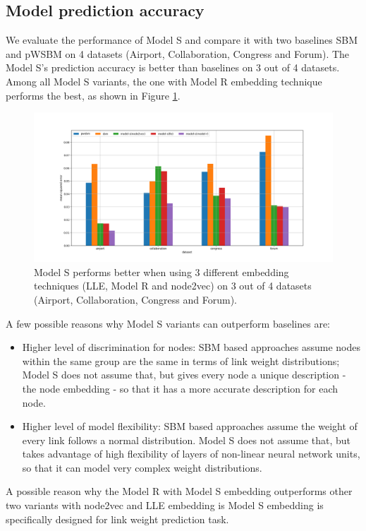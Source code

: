 \documentclass{article} %
\begin{document}
\subsection{Model prediction accuracy}
We evaluate the performance of Model S and compare it with two baselines SBM and pWSBM on 4 datasets (Airport, Collaboration, Congress and Forum).
The Model S's prediction accuracy is better than baselines on 3 out of 4 datasets.
Among all Model S variants,
the one with Model R embedding technique performs the best,
as shown in Figure \ref{fig:errors}.
\begin{figure}[h] \centering
	\includegraphics[width=1\linewidth]{weight-errors}
	\caption{
		Model S performs better when using 3 different embedding techniques (LLE, Model R and node2vec) on 3 out of 4 datasets (Airport, Collaboration, Congress and Forum).
	}
	\label{fig:errors}
\end{figure}
A few possible reasons why Model S variants can outperform baselines are:
\begin{itemize}
	\item Higher level of discrimination for nodes:
	SBM based approaches assume nodes within the same group are the same in terms of link weight distributions;
	Model S does not assume that,
	but gives every node a unique description - the node embedding - so that
	it has a more accurate description for each node.
	\item Higher level of model flexibility:
	SBM based approaches assume the weight of every link follows
	a normal distribution.
	Model S does not assume that, but takes advantage of high flexibility of
	layers of non-linear neural network units,
	so that it can model very complex weight distributions.
\end{itemize}
A possible reason why the Model R with Model S embedding outperforms other two variants with node2vec and LLE embedding is Model S embedding is specifically designed for link weight prediction task.
\end{document}
